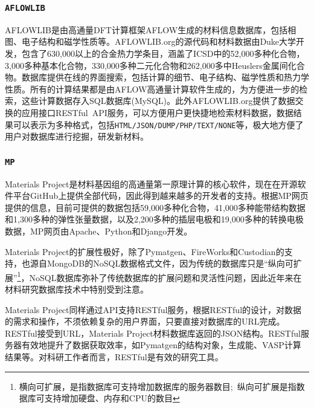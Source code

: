 \subsubsection{\tt{AFLOWLIB}}
\textrm{AFLOWLIB}是由高通量\textrm{DFT}计算框架\textrm{AFLOW}\cite{CMS58-218_2012,CMS58-227_2012,Nat-Mater12-191_2013}生成的材料信息数据库，包括相图、电子结构和磁学性质等。\textrm{AFLOWLIB.org}的源代码和材料数据由\textrm{Duke}大学开发\cite{AFLOWORG_URL}，包含了630,000以上的合金热力学条目，涵盖了\textrm{ICSD}中的52,000多种化合物，3,000多种基本化合物，330,000多种二元化合物和262,000多中\textrm{Heuslers}金属间化合物。数据库提供在线的界面搜索，包括计算的细节、电子结构、磁学性质和热力学性质。所有的计算结果都是由\textrm{AFLOW}高通量计算软件生成的，为方便进一步的检索，这些计算数据存入\textrm{SQL}数据库(\textrm{MySQL})。此外\textrm{AFLOWLIB.org}提供了数据交换的应用接口\textrm{RESTful~API}服务\cite{CMS93-178_2014}，可以方便用户更快捷地检索材料数据，数据结果可以表示为多种格式，包括\texttt{HTML/JSON/DUMP/PHP/TEXT/NONE}等，极大地方便了用户对数据库进行挖掘，研发新材料。

\subsubsection{\tt{MP}}
\textrm{Materials Project}是材料基因组的高通量第一原理计算的核心软件\cite{MP_URL}，现在在开源软件平台\textrm{GitHub}\cite{MP_Github}上提供全部代码，因此得到越来越多的开发者的支持。根据\textrm{MP}网页提供的信息\cite{MP_URL}，目前可提供的数据包括59,000多种化合物，41,000多种能带结构数据和1,300多种的弹性张量数据，以及2,200多种的插层电极和19,000多种的转换电极数据，\textrm{MP}网页由\textrm{Apache}、\textrm{Python}和\textrm{Django}开发。

\textrm{Materials Project}的扩展性极好，除了\textrm{Pymatgen}、\textrm{FireWorks}和\textrm{Custodian}的支持，也源自\textrm{MongoDB}的\textrm{NoSQL}数据格式文件，因为传统的数据库只是“纵向可扩展”\footnote{横向可扩展，是指数据库可支持增加数据库的服务器数目;~纵向可扩展是指数据库可支持增加硬盘、内存和\textrm{CPU}的数目}，\textrm{NoSQL}数据库弥补了传统数据库的扩展问题和灵活性问题，因此近年来在材料研究数据库技术中特别受到注意。

\textrm{Materials Project}同样通过\textrm{API}支持\textrm{RESTful}服务\cite{CMS68-314_2013}，根据\textrm{RESTful}的设计，对数据的需求和操作，不须依赖复杂的用户界面，只要直接对数据库的\textrm{URL}完成。\textrm{RESTful}接受到\textrm{URL}，\textrm{Materials Project}材料数据库返回的\textrm{JSON}结构。\textrm{RESTful}服务器有效地提升了数据获取效率，如\textrm{Pymatgen}的结构对象，\textrm{生成能}、\textrm{VASP}计算结果等。对科研工作者而言，\textrm{RESTful}是有效的研究工具。

